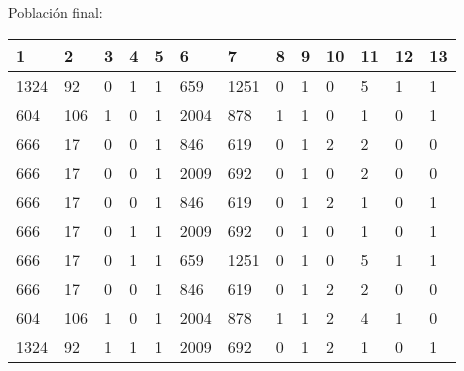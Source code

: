 Población final:
\begin{table}[H]
\begin{tabular}{|l|l|l|l|l|l|l|l|l|l|l|l|l|}
\hline
\textbf{1} & \textbf{2} & \textbf{3} & \textbf{4} & \textbf{5} & \textbf{6} & \textbf{7} & \textbf{8} & \textbf{9} & \textbf{10} & \textbf{11} & \textbf{12} & \textbf{13} \\ \hline
1324  &  92  &  0  &  1  &  1  &  659  &  1251  &  0  &  1  &  0  &  {\color[HTML]{FE0000}5}  &  1  &  1 \\ \hline
604  &  106  &  1  &  0  &  1  &  2004  &  878  &  1  &  1  &  0  &  1  &  0  &  1 \\ \hline
666  &  17  &  0  &  0  &  1  &  846  &  619  &  0  &  1  &  2  &  2  &  0  &  0 \\ \hline
666  &  17  &  0  &  0  &  1  &  2009  &  692  &  0  &  1  &  0  &  2  &  0  &  0 \\ \hline
666  &  17  &  0  &  0  &  1  &  846  &  619  &  0  &  1  &  2  &  1  &  0  &  1 \\ \hline
666  &  17  &  0  &  1  &  1  &  2009  &  692  &  0  &  1  &  0  &  1  &  0  &  1 \\ \hline
666  &  17  &  0  &  1  &  1  &  659  &  1251  &  0  &  1  &  0  &  {\color[HTML]{FE0000}5}  &  1  &  1 \\ \hline
666  &  17  &  0  &  0  &  1  &  846  &  619  &  0  &  1  &  2  &  2  &  0  &  0 \\ \hline
604  &  106  &  1  &  0  &  1  &  2004  &  878  &  1  &  1  &  2  &  {\color[HTML]{FE0000}4}  &  1  &  0 \\ \hline
1324  &  92  &  1  &  1  &  1  &  2009  &  692  &  0  &  1  &  2  &  1  &  0  &  1 \\ \hline
\end{tabular}
\end{table}


